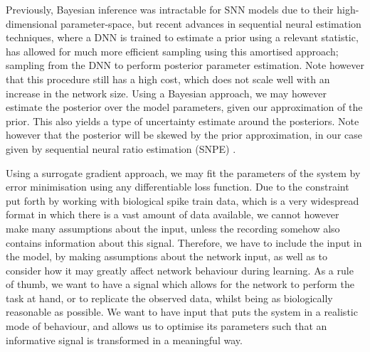 \documentclass[mphil,deptreport,ianc]{infthesis} %
\begin{document}
Previously, Bayesian inference was intractable for SNN models due to their high-dimensional parameter-space, but recent advances in sequential neural estimation techniques, where a DNN is trained to estimate a prior using a relevant statistic, has allowed for much more efficient sampling using this amortised approach; sampling from the DNN to perform posterior parameter estimation.
Note however that this procedure still has a high cost, which does not scale well with an increase in the network size.
Using a Bayesian approach, we may however estimate the posterior over the model parameters, given our approximation of the prior. This also yields a type of uncertainty estimate around the posteriors. Note however that the posterior will be skewed by the prior approximation, in our case given by sequential neural ratio estimation (SNPE) \cite{Lueckmann2021}.
 
Using a surrogate gradient approach, we may fit the parameters of the system by error minimisation using any differentiable loss function. Due to the constraint put forth by working with biological spike train data, which is a very widespread format in which there is a vast amount of data available, we cannot however make many assumptions about the input, unless the recording somehow also contains information about this signal. 
Therefore, we have to include the input in the model, by making assumptions about the network input, as well as to consider how it may greatly affect network behaviour during learning. As a rule of thumb, we want to have a signal which allows for the network to perform the task at hand, or to replicate the observed data, whilst being as biologically reasonable as possible.
We want to have input that puts the system in a realistic mode of behaviour, and allows us to optimise its parameters such that an informative signal is transformed in a meaningful way.


\end{document}
